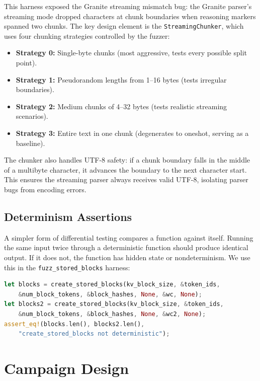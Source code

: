 This harness exposed the Granite streaming mismatch bug: the Granite parser's streaming mode dropped characters at chunk boundaries when reasoning markers spanned two chunks. The key design element is the \texttt{StreamingChunker}, which uses four chunking strategies controlled by the fuzzer:

\begin{itemize}
  \item \textbf{Strategy 0:} Single-byte chunks (most aggressive, tests every possible split point).
  \item \textbf{Strategy 1:} Pseudorandom lengths from 1--16 bytes (tests irregular boundaries).
  \item \textbf{Strategy 2:} Medium chunks of 4--32 bytes (tests realistic streaming scenarios).
  \item \textbf{Strategy 3:} Entire text in one chunk (degenerates to oneshot, serving as a baseline).
\end{itemize}

The chunker also handles UTF-8 safety: if a chunk boundary falls in the middle of a multibyte character, it advances the boundary to the next character start. This ensures the streaming parser always receives valid UTF-8, isolating parser bugs from encoding errors.

\subsection{Determinism Assertions}

A simpler form of differential testing compares a function against itself. Running the same input twice through a deterministic function should produce identical output. If it does not, the function has hidden state or nondeterminism. We use this in the \texttt{fuzz\_stored\_blocks} harness:

\begin{lstlisting}[language=Rust,caption={Determinism assertion: same input must produce same output.}]
let blocks = create_stored_blocks(kv_block_size, &token_ids,
    &num_block_tokens, &block_hashes, None, &wc, None);
let blocks2 = create_stored_blocks(kv_block_size, &token_ids,
    &num_block_tokens, &block_hashes, None, &wc2, None);
assert_eq!(blocks.len(), blocks2.len(),
    "create_stored_blocks not deterministic");
\end{lstlisting}

\section{Campaign Design}
\label{sec:fuzzing:design}


